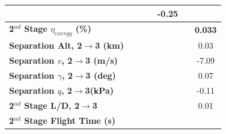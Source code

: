 \begin{table}[ht]
\begin{tabular}{l c c c c c c}
		& \firstsecondSeparationgammamThreeStandardNoReturn
		& \firstsecondSeparationgammamThreeOneHundredFiveNoReturn
		& \firstsecondSeparationgammamThreeOneHundredTenNoReturn
		&-0.25
		\\
		\hline 
		\textbf{2$^{nd}$ Stage $\eta_{exergy}$ (\%)}
		& \textbf{\secondExergyEffmThreeNinetyNoReturn}
		& \textbf{\secondExergyEffmThreeNinetyFiveNoReturn}
		& \textbf{\secondExergyEffmThreeStandardNoReturn}
		& \textbf{\secondExergyEffmThreeOneHundredFiveNoReturn}
		& \textbf{\secondExergyEffmThreeOneHundredTenNoReturn}
		& \textbf{0.033}
		\\
		\textbf{Separation Alt, 2$\rightarrow$3 (km)}
		& \secondthirdSeparationAltmThreeNinetyNoReturn
		& \secondthirdSeparationAltmThreeNinetyFiveNoReturn
		& \secondthirdSeparationAltmThreeStandardNoReturn
		& \secondthirdSeparationAltmThreeOneHundredFiveNoReturn
		& \secondthirdSeparationAltmThreeOneHundredTenNoReturn
		&0.03
		\\
		\textbf{Separation $v$, 2$\rightarrow$3 (m/s)}
		& \secondthirdSeparationvmThreeNinetyNoReturn
		& \secondthirdSeparationvmThreeNinetyFiveNoReturn
		& \secondthirdSeparationvmThreeStandardNoReturn
		& \secondthirdSeparationvmThreeOneHundredFiveNoReturn
		& \secondthirdSeparationvmThreeOneHundredTenNoReturn
		&-7.09
		\\
		\textbf{Separation $\gamma$, 2$\rightarrow$3 (deg)}
		& \secondthirdSeparationgammamThreeNinetyNoReturn
		& \secondthirdSeparationgammamThreeNinetyFiveNoReturn
		& \secondthirdSeparationgammamThreeStandardNoReturn
		& \secondthirdSeparationgammamThreeOneHundredFiveNoReturn
		& \secondthirdSeparationgammamThreeOneHundredTenNoReturn
		&0.07
		\\
		\textbf{Separation $q$, 2$\rightarrow$3(kPa)}
		& \secondthirdSeparationqmThreeNinetyNoReturn
		& \secondthirdSeparationqmThreeNinetyFiveNoReturn
		& \secondthirdSeparationqmThreeStandardNoReturn
		& \secondthirdSeparationqmThreeOneHundredFiveNoReturn
		& \secondthirdSeparationqmThreeOneHundredTenNoReturn
		&-0.11
		\\
		\textbf{2$^{nd}$ Stage L/D, 2$\rightarrow$3}
		& \secondthirdSeparationLDmThreeNinetyNoReturn
		& \secondthirdSeparationLDmThreeNinetyFiveNoReturn
		& \secondthirdSeparationLDmThreeStandardNoReturn
		& \secondthirdSeparationLDmThreeOneHundredFiveNoReturn
		& \secondthirdSeparationLDmThreeOneHundredTenNoReturn
		&0.01
		\\
		\textbf{2$^{nd}$ Stage Flight Time (s)}
		& \secondFlightTimemThreeNinetyNoReturn
		& \secondFlightTimemThreeNinetyFiveNoReturn

\end{tabular}
\end{table}

